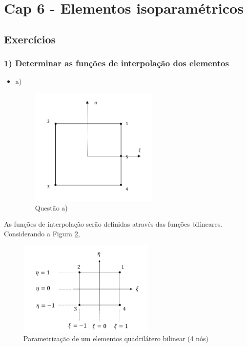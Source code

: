 \section{Cap 6 - Elementos isoparamétricos}

\subsection{Exercícios}

\subsubsection{1) Determinar as funções de interpolação dos elementos}
%
\begin{itemize}
	\item a)
	\begin{figure}[H]
	\includegraphics[width=0.6\textwidth,center]{fig/cap6_1_a.PNG}
	\caption{Questão a)} 
	\label{cap6:cap6_1_a}
\end{figure}
%
\end{itemize}
%
As funções de interpolação serão definidas através das funções bilineares. Considerando a Figura \ref{cap6:quad_bilinear_0}, 
%
\begin{figure}[H]
	\includegraphics[width=0.6\textwidth,center]{fig/quadrilatero_4_livro.PNG}
	\caption{Parametrização de um elementos quadrilátero bilinear (4 nós)} 
	\label{cap6:quad_bilinear_0}
\end{figure}

